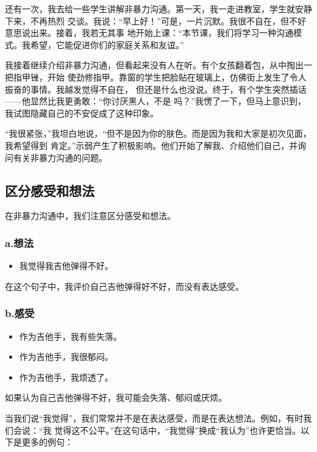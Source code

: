 \documentclass{ctexart}
\begin{document}
还有一次，我去给一些学生讲解非暴力沟通。第一天，我一走进教室，学生就安静下来，不再热烈
交谈。我说：``早上好！''可是，一片沉默。我很不自在，但不好意思说出来。接着，我若无其事
地开始上课：``本节课，我们将学习一种沟通模式。我希望，它能促进你们的家庭关系和友谊。''

我接着继续介绍非暴力沟通，但看起来没有人在听。有个女孩翻着包，从中掏出一把指甲锉，开始
使劲修指甲。靠窗的学生把脸贴在玻璃上，仿佛街上发生了令人振奋的事情。我越发觉得不自在，
但还是什么也没说。终于，有个学生突然插话------他显然比我更勇敢：``你讨厌黑人，不是
吗？''我愣了一下，但马上意识到，我试图隐藏自己的不安促成了这种印象。

``我很紧张，''我坦白地说，``但不是因为你的肤色。而是因为我和大家是初次见面，我希望得到
肯定。''示弱产生了积极影响。他们开始了解我、介绍他们自己，并询问有关非暴力沟通的问题。


\subsection{区分感受和想法}

在非暴力沟通中，我们注意区分感受和想法。

\subsubsection*{a.想法}

\begin{itemize}
	\item 我觉得我吉他弹得不好。
\end{itemize}

在这个句子中，我评价自己吉他弹得好不好，而没有表达感受。

\subsubsection*{b.感受}

\begin{itemize}
	\item 作为吉他手，我有些失落。
	\item 作为吉他手，我很郁闷。
	\item 作为吉他手，我烦透了。
\end{itemize}

如果认为自己吉他弹得不好，我可能会失落、郁闷或厌烦。

当我们说``我觉得''，我们常常并不是在表达感受，而是在表达想法。例如，有时我们会说：``我
觉得这不公平。''在这句话中，``我觉得''换成``我认为''也许更恰当。以下是更多的例句：
\end{document}
